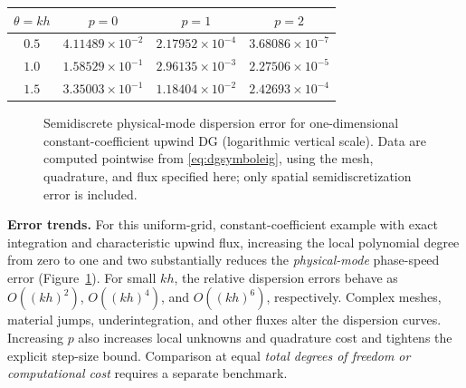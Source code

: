 \documentclass[11pt,openany]{book}
\numberwithin{equation}{chapter}
\theoremstyle{definition}
\theoremstyle{remark}
\begin{document}
\begin{center}
\begin{tabular}{cccc}
\toprule
$\theta=kh$ & $p=0$ & $p=1$ & $p=2$\\
\midrule
$0.5$ & $4.11489\times10^{-2}$ & $2.17952\times10^{-4}$ & $3.68086\times10^{-7}$\\
$1.0$ & $1.58529\times10^{-1}$ & $2.96135\times10^{-3}$ & $2.27506\times10^{-5}$\\
$1.5$ & $3.35003\times10^{-1}$ & $1.18404\times10^{-2}$ & $2.42693\times10^{-4}$\\
\bottomrule
\end{tabular}
\end{center}

\begin{figure}[htbp]
\centering
{}
\caption{Semidiscrete physical-mode dispersion error for one-dimensional constant-coefficient upwind DG (logarithmic vertical scale).
Data are computed pointwise from \eqref{eq:dgsymboleig}, using the mesh, quadrature, and flux specified here; only spatial semidiscretization error is included.}
\label{fig:dgdisp}
\end{figure}
\FloatBarrier

\noindent\textbf{Error trends.}
For this uniform-grid, constant-coefficient example with exact integration and characteristic upwind flux,
increasing the local polynomial degree from zero to one and two substantially reduces the \emph{physical-mode} phase-speed error (Figure~\ref{fig:dgdisp}).
For small $kh$, the relative dispersion errors behave as $O((kh)^2)$, $O((kh)^4)$, and $O((kh)^6)$, respectively.
Complex meshes, material jumps, underintegration, and other fluxes alter the dispersion curves.
Increasing $p$ also increases local unknowns and quadrature cost and tightens the explicit step-size bound.
Comparison at equal \emph{total degrees of freedom or computational cost} requires a separate benchmark.
\end{document}
